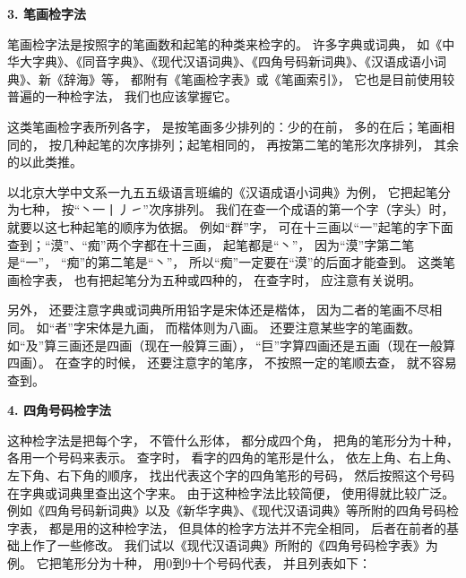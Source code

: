 \textbf{3. 笔画检字法}

笔画检字法是按照字的笔画数和起笔的种类来检字的。
许多字典或词典，
如《中华大字典》、《同音字典》、《现代汉语词典》、《四角号码新词典》、《汉语成语小词典》、新《辞海》等，
都附有《笔画检字表》或《笔画索引》，
它也是目前使用较普遍的一种检字法，
我们也应该掌握它。

这类笔画检字表所列各字，
是按笔画多少排列的：少的在前，
多的在后；笔画相同的，
按几种起笔的次序排列；起笔相同的，
再按第二笔的笔形次序排列，
其余的以此类推。

以北京大学中文系一九五五级语言班编的《汉语成语小词典》为例，
它把起笔分为七种，
按“丶一丨丿㇀”次序排列。
我们在查一个成语的第一个字（字头）时，
就要以这七种起笔的顺序为依据。
例如“群”字，
可在十三画以“一”起笔的字下面查到；“漠”、“痴”两个字都在十三画，
起笔都是“丶”，
因为“漠”字第二笔是“一”，
“痴”的第二笔是“丶”，
所以“痴”一定要在“漠”的后面才能查到。
这类笔画检字表，
也有把起笔分为五种或四种的，
在查字时，
应注意有关说明。

另外，
还要注意字典或词典所用铅字是宋体还是楷体，
因为二者的笔画不尽相同。
如“者”字宋体是九画，
而楷体则为八画。
还要注意某些字的笔画数。
如“及”算三画还是四画（现在一般算三画），
“巨”字算四画还是五画（现在一般算四画）。
在查字的时候，
还要注意字的笔序，
不按照一定的笔顺去查，
就不容易查到。

\textbf{4. 四角号码检字法}

这种检字法是把每个字，
不管什么形体，
都分成四个角，
把角的笔形分为十种，
各用一个号码来表示。
查字时，
看字的四角的笔形是什么，
依左上角、右上角、左下角、右下角的顺序，
找出代表这个字的四角笔形的号码，
然后按照这个号码在字典或词典里查出这个字来。
由于这种检字法比较简便，
使用得就比较广泛。
例如《四角号码新词典》以及《新华字典》、《现代汉语词典》等所附的四角号码检字表，
都是用的这种检字法，
但具体的检字方法并不完全相同，
后者在前者的基础上作了一些修改。
我们试以《现代汉语词典》所附的《四角号码检字表》为例。
它把笔形分为十种，
用0到9十个号码代表，
并且列表如下：


